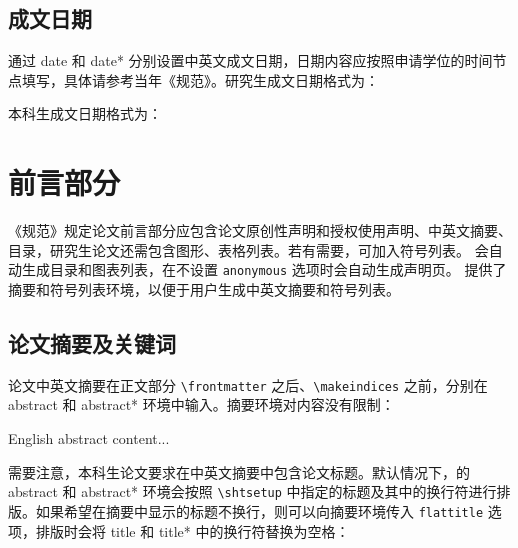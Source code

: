 \documentclass[master]{shtthesis}
\begin{document}
\subsection{成文日期}
通过 date 和 date* 分别设置中英文成文日期，日期内容应按照申请学位的时间节点填写，具体请参考当年《规范》。研究生成文日期格式为：
\begin{latex}
\end{latex}
本科生成文日期格式为：
\begin{latex}
\end{latex}

\section{前言部分}
《规范》规定论文前言部分应包含论文原创性声明和授权使用声明、中英文摘要、目录，研究生论文还需包含图形、表格列表。若有需要，可加入符号列表。\shtthesis{} 会自动生成目录和图表列表，在不设置 \verb|anonymous| 选项时会自动生成声明页。\shtthesis{} 提供了摘要和符号列表环境，以便于用户生成中英文摘要和符号列表。

\subsection{论文摘要及关键词}
论文中英文摘要在正文部分 \verb|\frontmatter| 之后、\verb|\makeindices| 之前，分别在 abstract 和 abstract* 环境中输入。摘要环境对内容没有限制：
\begin{latex}
\begin{abstract}
  中文摘要内容...
\end{abstract}

\begin{abstract*}
  English abstract content...
\end{abstract*}
\end{latex}

需要注意，本科生论文要求在中英文摘要中包含论文标题。默认情况下，\shtthesis 的 abstract 和 abstract* 环境会按照 \verb|\shtsetup| 中指定的标题及其中的换行符进行排版。如果希望在摘要中显示的标题不换行，则可以向摘要环境传入 \verb|flattitle| 选项，排版时会将 title 和 title* 中的换行符替换为空格：
\begin{latex}
\begin{abstract}[flattitle]
  中文摘要内容...
\end{abstract}
\end{latex}
\end{document}

